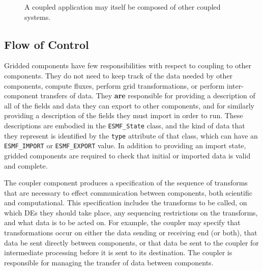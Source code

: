 \begin{figure}
\caption[{Scoping of Components in a Coupled Application}]{A coupled
application may itself be composed of other coupled systems.}
\label{fig:couplerscaling}
\end{figure}

\subsection{Flow of Control}

Gridded components have few responsibilities with respect to coupling
to other components.  They do not need to keep track of the data needed
by other components, compute fluxes, perform grid transformations, or 
perform inter-component transfers of data.  They {\bf are} responsible for 
providing a description of all of the fields and data they
can export to other components, and for similarly providing a description 
of the fields they must import in order to run.  These descriptions are
embodied in the {\tt ESMF\_State} class, and the kind of data that they 
represent is identified by the {\tt type} attribute of that class, which can
have an {\tt ESMF\_IMPORT} or {\tt ESMF\_EXPORT} value.  In addition to 
providing an import state, gridded components are required to check that 
initial or imported data is valid and complete.

The coupler component produces a specification of the sequence of 
transforms that are necessary to effect communication between components, 
both scientific and computational.  This specification includes the 
transforms to be
called, on which DEs they should take place, any sequencing restrictions 
on the transforms, and what data is to be acted on.  For example, the
coupler may specify that transformations occur on either the data sending 
or receiving end (or both), that data be sent directly between components,
or that data be sent to the coupler for intermediate processing before 
it is sent to its destination.  The coupler is responsible for managing
the transfer of data between components.    

